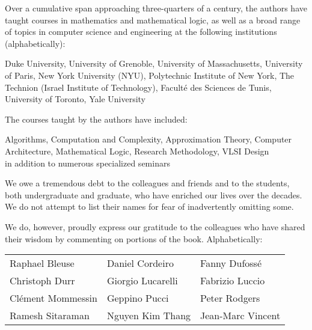 \bigskip

Over a cumulative span approaching three-quarters of a century, the authors have taught courses in mathematics and mathematical logic, as well as a broad range of topics in computer science and engineering at the following institutions (alphabetically):

\smallskip

\noindent
Duke University, 
University of Grenoble,
University of Massachusetts,
University of Paris,
New York University (NYU),
Polytechnic Institute of New York,
The Technion (Israel Institute of Technology),
Facult\'e des Sciences de Tunis,
University of Toronto,
Yale University

\medskip

\noindent
The courses taught by the authors have included:

\smallskip

\noindent
Algorithms,
Computation and Complexity, Approximation Theory,
Computer Architecture,
Mathematical Logic,
Research Methodology,
VLSI Design \\
in addition to numerous specialized seminars

\vspace*{.25in}

\noindent
We owe a tremendous debt to the colleagues and friends and to the students, both undergraduate and graduate, who have enriched our lives over the decades.  We do not attempt to list their names for fear of inadvertently omitting some.

\noindent
We do, however, proudly express our gratitude to the colleagues who have shared their wisdom by commenting on portions of the book.  Alphabetically:

\begin{center}
\begin{tabular}{lll}
Raphael Bleuse & \hspace*{.35in}
Daniel Cordeiro & \hspace*{.35in}
Fanny Dufoss\'{e}  \\
Christoph Durr & \hspace*{.35in}
Giorgio Lucarelli & \hspace*{.35in}
Fabrizio Luccio \\
Cl\'{e}ment Mommessin & \hspace*{.35in}
Geppino Pucci & \hspace*{.35in}
Peter Rodgers \\
Ramesh Sitaraman & \hspace*{.35in}
Nguyen Kim Thang & \hspace*{.35in}
Jean-Marc Vincent
\end{tabular}
\end{center}

